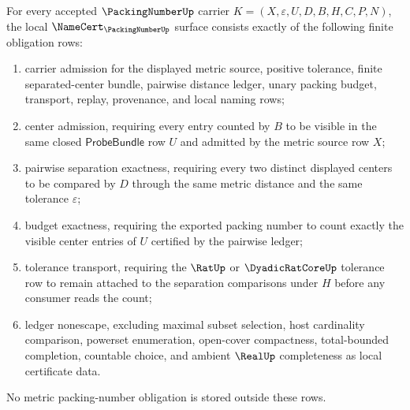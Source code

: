 \begin{theorem}
\label{thm:packing-number-namecert-obligations}
For every accepted $\PackingNumberUp$ carrier $K=(X,\varepsilon,U,D,B,H,C,P,N)$, the local $\NameCert_{\PackingNumberUp}$ surface consists exactly of the following finite obligation rows:
\begin{enumerate}
\item carrier admission for the displayed metric source, positive tolerance, finite separated-center bundle, pairwise distance ledger, unary packing budget, transport, replay, provenance, and local naming rows;
\item center admission, requiring every entry counted by $B$ to be visible in the same closed $\mathsf{ProbeBundle}$ row $U$ and admitted by the metric source row $X$;
\item pairwise separation exactness, requiring every two distinct displayed centers to be compared by $D$ through the same metric distance and the same tolerance $\varepsilon$;
\item budget exactness, requiring the exported packing number to count exactly the visible center entries of $U$ certified by the pairwise ledger;
\item tolerance transport, requiring the $\RatUp$ or $\DyadicRatCoreUp$ tolerance row to remain attached to the separation comparisons under $H$ before any consumer reads the count;
\item ledger nonescape, excluding maximal subset selection, host cardinality comparison, powerset enumeration, open-cover compactness, total-bounded completion, countable choice, and ambient $\RealUp$ completeness as local certificate data.
\end{enumerate}
No metric packing-number obligation is stored outside these rows.
\end{theorem}
